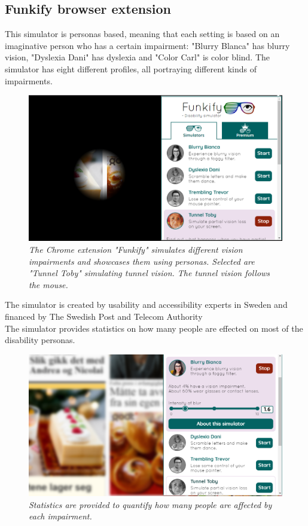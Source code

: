 \subsection{Funkify browser extension}
This simulator is personas based, meaning that each setting is based on an imaginative person who has a certain impairment: "Blurry Blanca" has blurry vision, "Dyslexia Dani" has dyslexia and "Color Carl" is color blind. The simulator has eight different profiles, all portraying different kinds of impairments.
\begin{figure}[H]
  \includegraphics[width=\linewidth]{img/funkify.png}
  \caption{\textit{The Chrome extension "Funkify" simulates different vision impairments and showcases them using personas. Selected are "Tunnel Toby" simulating tunnel vision. The tunnel vision follows the mouse.}}\label{fig:funkify_tunnel}
\endminipage\hfill
\end{figure}
The simulator is created by usability and accessibility experts in Sweden and financed by The Swedish Post and Telecom Authority \parencite{funkify.org_funkify_????}\\

\noindent
The simulator provides statistics on how many people are effected on most of the disability personas.
\begin{figure}[H]
  \includegraphics[width=\linewidth]{img/funkify_stats.png}
  \caption{\textit{Statistics are provided to quantify how many people are affected by each impairment.}}\label{fig:funkify_statistics}
\endminipage\hfill
\end{figure}

